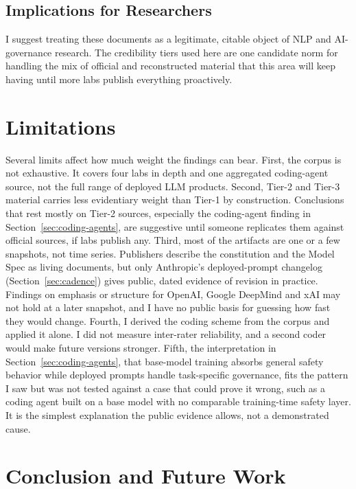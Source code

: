 \documentclass[11pt]{article}
\begin{document}
\subsection{Implications for Researchers}
I suggest treating these documents as a legitimate, citable object of NLP and
AI-governance research. The credibility tiers used here are one candidate norm
for handling the mix of official and reconstructed material that this area
will keep having until more labs publish everything proactively.

\section{Limitations}

Several limits affect how much weight the findings can bear. First, the
corpus is not exhaustive. It covers four labs in depth and one aggregated
coding-agent source, not the full range of deployed LLM products. Second,
Tier-2 and Tier-3 material carries less evidentiary weight than Tier-1 by
construction. Conclusions that rest mostly on Tier-2 sources, especially the
coding-agent finding in Section~\ref{sec:coding-agents}, are suggestive until
someone replicates them against official sources, if labs publish any. Third,
most of the artifacts are one or a few snapshots, not time series. Publishers
describe the constitution and the Model Spec as living documents, but only
Anthropic's deployed-prompt changelog (Section~\ref{sec:cadence}) gives
public, dated evidence of revision in practice. Findings on emphasis or
structure for OpenAI, Google DeepMind and xAI may not hold at a later
snapshot, and I have no public basis for guessing how fast they would change.
Fourth, I derived the coding scheme from the corpus and applied it alone. I
did not measure inter-rater reliability, and a second coder would make future
versions stronger. Fifth, the interpretation in
Section~\ref{sec:coding-agents}, that base-model training absorbs general
safety behavior while deployed prompts handle task-specific governance, fits
the pattern I saw but was not tested against a case that could prove it wrong,
such as a coding agent built on a base model with no comparable training-time
safety layer. It is the simplest explanation the public evidence allows, not a
demonstrated cause.

\section{Conclusion and Future Work}
\end{document}
